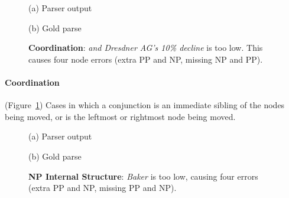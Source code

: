\begin{figure}
\begin{center}

\vspace{3mm}
(a) Parser output

\vspace{6mm}


\vspace{3mm}
(b) Gold parse
\end{center}
\derivspace
\caption[Error analysis example: coordination.]{ \label{fig:coordination} 
	\textbf{Coordination}: \emph{and Dresdner AG's 10\% decline} is too low.
	This causes four node errors (extra PP and NP, missing NP and PP).
}
\derivaftercompress
\end{figure}

\paragraph{Coordination} (Figure~\ref{fig:coordination}) 
Cases in which a conjunction is an immediate sibling of the nodes being moved, or is the leftmost or rightmost node being moved.

\begin{figure}
\begin{center}

\vspace{3mm}
(a) Parser output

\vspace{6mm}


\vspace{3mm}
(b) Gold parse
\end{center}
\derivspace
\caption[Error analysis example: NP internal structure.]{ \label{fig:NP-internal-structure} 
	\textbf{NP Internal Structure}: \emph{Baker} is too low, causing four
	errors (extra PP and NP, missing PP and NP).
}
\derivaftercompress
\end{figure}

